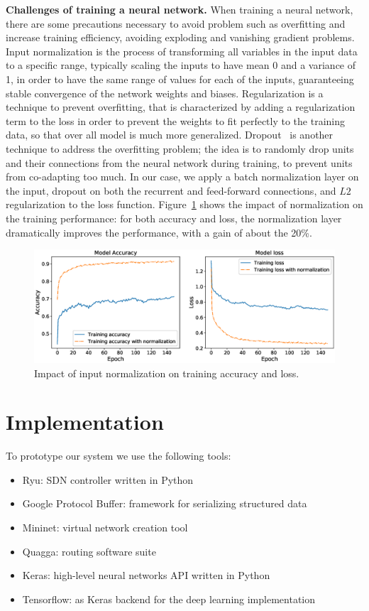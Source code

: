 \noindent
{\bf Challenges of training a neural network.}
When training a neural network, there are some precautions necessary to avoid problem such as overfitting and increase training efficiency, avoiding exploding and vanishing gradient problems. Input normalization is the process of transforming all variables in the input data to a specific range, typically scaling the inputs to have mean 0 and a variance of 1, in order to have the same range of values for each of the inputs, guaranteeing stable convergence of the network weights and biases. Regularization is a technique to prevent overfitting, that  is characterized by adding a regularization term to the loss in order to prevent the weights to fit perfectly to the training data,  so that over all model is much more generalized. Dropout~\cite{srivastava2014dropout} is another technique to address the overfitting problem; the idea is to randomly drop units and their connections from the neural network during training, to prevent units from co-adapting too much.
In our case, we apply a batch normalization layer on the input, dropout on both the recurrent and feed-forward connections, and $L2$ regularization to the loss function. Figure~\ref{fig:normalization_cmp} shows the impact of normalization on the training performance: for both accuracy and loss, the normalization layer dramatically improves the performance, with a gain of about the 20\%.

\begin{figure}
\centering
\includegraphics[width=\textwidth]{img/normalization_cmp}
\caption{Impact of input normalization on training accuracy and loss.}
\label{fig:normalization_cmp}
\end{figure}

\section{Implementation}
\label{sec:implementation}
To prototype our system we use the following tools:
\begin{itemize}
\item Ryu: SDN controller written in Python~\cite{ryu}
\item Google Protocol Buffer: framework for serializing structured data~\cite{protobuf}
\item Mininet: virtual network creation tool~\cite{mininet}
\item Quagga: routing software suite~\cite{quagga}
\item Keras: high-level neural networks API written in Python~\cite{keras}
\item Tensorflow: as Keras backend for the deep learning implementation~\cite{tensorflow}
\end{itemize}